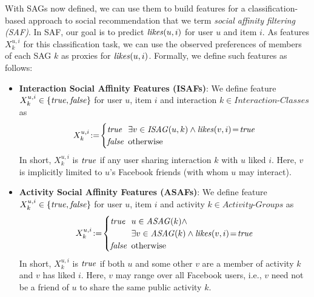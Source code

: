 \label{ssec:SAfeature}

With SAGs now defined, we can use them to build features for a
classification-based approach to social recommendation that we term
\emph{social affinity filtering (SAF)}.  In SAF, our goal is to
predict $\like(u,i)$ for user $u$ and item $i$.  As features
$X^{u,i}_k$ for this classification task, we can use the observed
preferences of members of each SAG $k$ as proxies for $\like(u,i)$.
Formally, we define such features as follows:

\begin{itemize} 
\item \textbf{Interaction Social Affinity Features (ISAFs)}: 
We define feature $X^{u,i}_k \in \{ \true, \false \}$ for user $u$, item $i$ and interaction
$k \in \textit{Interaction-Classes}$ as
  \begin{equation*}
   X^{u,i}_{k} \! := \!
      \begin{cases}
   		\true  \!\!\! & \exists v \in \mathit{ISAG}(u,k) \wedge \likes(v,i)\!=\!\true\\ 
   		\false \!\!\! & \text{otherwise}
      \end{cases}
  \end{equation*}
   In short, $X^{u,i}_{k}$ is $\true$ if any user sharing interaction $k$ with $u$ liked $i$.
   Here, $v$ is implicitly limited to $u$'s Facebook friends (with whom $u$
   may interact).
\item \textbf{Activity Social Affinity Features (ASAFs)}: 
We define feature $X^{u,i}_k \in \{ \true, \false \}$ for user $u$, item $i$ and activity
$k \in \textit{Activity-Groups}$ as
  \begin{equation*}
   X^{u,i}_{k} \! := \! 
      \begin{cases}
   		\true  \!\!\! & u \in \mathit{ASAG}(k) \wedge \\
                              & \exists v \in \mathit{ASAG}(k) \wedge \likes(v,i)\!=\!\true\\
   		\false \!\!\! & \text{otherwise}
      \end{cases}
  \end{equation*}
  In short, $X^{u,i}_{k}$ is $\true$ if both $u$ and some other $v$ are a member of activity $k$
  and $v$ has liked $i$.  Here, $v$ may range over all Facebook users, 
  i.e., $v$ need not be a friend of $u$ to share the same public activity $k$.
\end{itemize}


